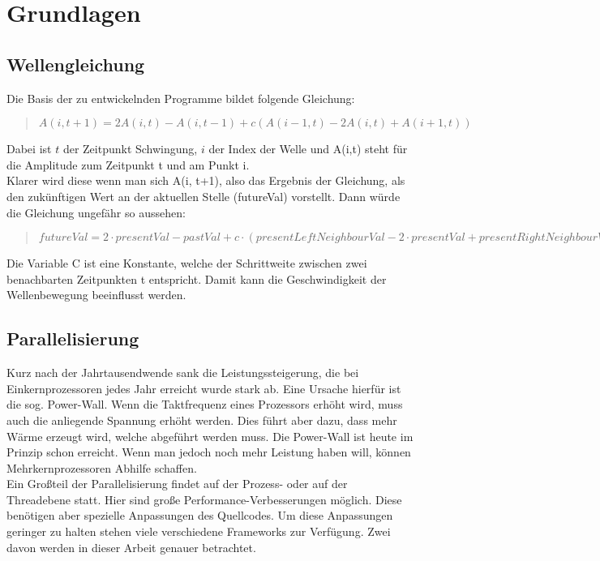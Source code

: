 
\section{Grundlagen}

\subsection{Wellengleichung}\label{sec:wave_equation}
Die Basis der zu entwickelnden Programme bildet folgende Gleichung:
\begin{quote}
	$A(i, t + 1) = 2A(i, t) - A(i, t - 1) + c(A(i - 1, t) - 2A(i, t) + A(i + 1, t))$
\end{quote}
Dabei ist $t$ der Zeitpunkt Schwingung, $i$ der Index der Welle und A(i,t) steht für die Amplitude zum Zeitpunkt t und am Punkt i.\\
Klarer wird diese wenn man sich A(i, t+1), also das Ergebnis der Gleichung, als den zukünftigen Wert an der aktuellen Stelle (futureVal) vorstellt. Dann würde die Gleichung ungefähr so aussehen:
\begin{quote}
	$futureVal = 2 \cdot presentVal - pastVal + c \cdot (presentLeftNeighbourVal - 2 \cdot presentVal + presentRightNeighbourVal)$
\end{quote} 
Die Variable C ist eine Konstante, welche der Schrittweite zwischen zwei benachbarten Zeitpunkten t entspricht. Damit kann die Geschwindigkeit der Wellenbewegung beeinflusst werden.

\subsection{Parallelisierung}
Kurz nach der Jahrtausendwende sank die Leistungssteigerung, die bei Einkernprozessoren jedes Jahr erreicht wurde stark ab. Eine Ursache hierfür ist die sog. Power-Wall. Wenn die Taktfrequenz eines Prozessors erhöht wird, muss auch die anliegende Spannung erhöht werden. Dies führt aber dazu, dass mehr Wärme erzeugt wird, welche abgeführt werden muss. Die Power-Wall ist heute im Prinzip schon erreicht. Wenn man jedoch noch mehr Leistung haben will, können Mehrkernprozessoren Abhilfe schaffen.\\
Ein Großteil der Parallelisierung findet auf der Prozess- oder auf der Threadebene statt. Hier sind große Performance-Verbesserungen möglich. Diese benötigen aber spezielle Anpassungen des Quellcodes. Um diese Anpassungen geringer zu halten stehen viele verschiedene Frameworks zur Verfügung. Zwei davon werden in dieser Arbeit genauer betrachtet.

